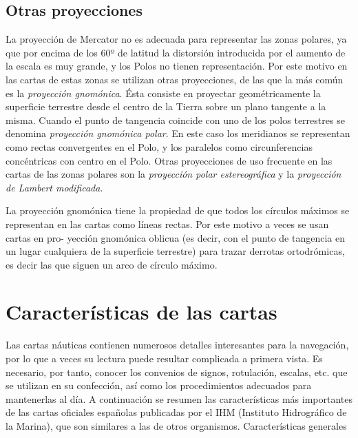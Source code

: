 \subsection{Otras proyecciones}


La proyección de Mercator no es adecuada para representar las zonas polares, ya que por 
encima de los 60º de latitud la distorsión introducida por el aumento de la escala es muy 
grande, y los Polos no tienen representación. Por este motivo en las cartas de estas zonas 
se utilizan otras proyecciones, de las que la más común es la \emph{proyección gnomónica}. Ésta 
consiste en proyectar geométricamente la superficie terrestre desde el centro de la Tierra 
sobre un plano tangente a la misma. Cuando el punto de tangencia coincide con uno de los 
polos terrestres se denomina \emph{proyección gnomónica polar}. En este caso los meridianos se 
representan como rectas convergentes en el Polo, y los paralelos como circunferencias 
concéntricas con centro en el Polo. Otras proyecciones de uso frecuente en las cartas de las 
zonas polares son la \emph{proyección polar estereográfica} y la 
\emph{proyección de Lambert modificada}. 

La proyección gnomónica tiene la propiedad de que todos los círculos máximos se 
representan en las cartas como líneas rectas. Por este motivo a veces se usan cartas en pro- 
yección gnomónica oblicua (es decir, con el punto de tangencia en un lugar cualquiera de 
la superficie terrestre) para trazar derrotas ortodrómicas, es decir las que siguen un arco 
de círculo máximo. 

\section{Características de las cartas}


Las cartas náuticas contienen numerosos detalles interesantes para la navegación, por lo 
que a veces su lectura puede resultar complicada a primera vista. Es necesario, por tanto, 
conocer los convenios de signos, rotulación, escalas, etc. que se utilizan en su confección, 
así como los procedimientos adecuados para mantenerlas al día. A continuación se resumen las características más importantes de las cartas oficiales españolas publicadas por el 
IHM (Instituto Hidrográfico de la Marina), que son similares a las de otros organismos. 
Características generales  

